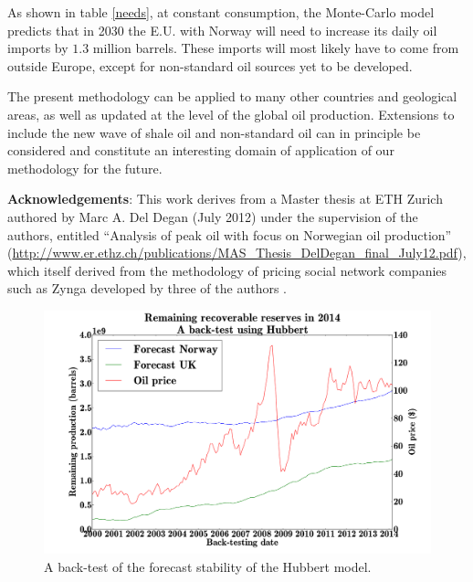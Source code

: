 \documentclass[review]{elsarticle}
\begin{document}
As shown in table \ref{needs}, at constant consumption, the Monte-Carlo
model predicts that in 2030 the E.U. with Norway will need to increase
its daily oil imports by $1.3$ million barrels. These imports will most
likely have to come from outside Europe, except for  
non-standard oil sources yet to be developed.


The present methodology can be applied to many other countries
and geological areas, as well as updated at the level of the global
oil production. Extensions to include the new wave of shale oil and
non-standard oil can in principle be considered and constitute
an interesting domain of application of our methodology for the future.


\vskip 0.5cm
\noindent
{\bf Acknowledgements}: This work derives from a Master thesis at ETH Zurich authored by 
Marc A. Del Degan (July 2012) under the supervision of the authors, 
entitled ``Analysis of peak oil with focus on Norwegian oil production''
(\url{http://www.er.ethz.ch/publications/MAS_Thesis_DelDegan_final_July12.pdf}), which
itself derived from the methodology of pricing social network companies such as Zynga developed
by three of the authors \cite{Forro2012}.






\newpage{}

\noindent 
\begin{figure}[H]
\includegraphics[width=1\columnwidth]{hubbert-backtest}
\caption{A back-test of the forecast stability of the Hubbert model.}
\label{hubbert-backtest} 
\end{figure}

\pagebreak
\end{document}
